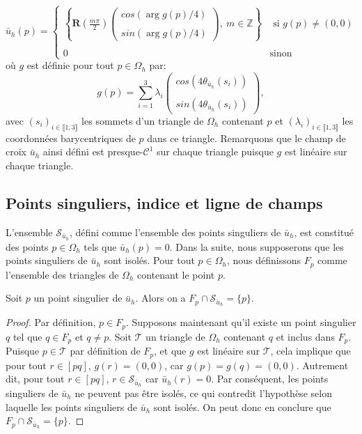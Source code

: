 \begin{equation}
    \bar{u}_h(p) =
\left\{ 
    \begin{array}{lc}
        \displaystyle\left\{\mathbf{R}\left(\frac{m\pi}{2}\right)
        \begin{pmatrix} 
          cos(\arg{g(p)}/4)\\\\
          sin(\arg{g(p)}/4)
        \end{pmatrix},
        ~ m\in \mathbb{Z}\right\} &\text{ si }g(p)\neq (0, 0)\\\\
        0& \text{sinon}
    \end{array} 
\right.
\label{eqn:def_u_h}
\end{equation}
où $g$ est définie pour tout $p\in\Omega_h$ par:
\begin{equation}
    g(p)=\sum_{i=1}^3\lambda_i
    \begin{pmatrix} 
      cos(4\theta_{\bar{u}_h}(s_i))\\\\
      sin(4\theta_{\bar{u}_h}(s_i))
    \end{pmatrix},
\end{equation}
avec $(s_i)_{i\in\llbracket 1, 3\rrbracket}$ les sommets d'un triangle de $\Omega_h$ contenant $p$ et $(\lambda_i)_{i\in\llbracket 1, 3\rrbracket}$ les coordonnées barycentriques de $p$ dans ce triangle. Remarquons que le champ de croix $\bar{u}_h$ ainsi défini est presque-$\mathcal{C}^1$ sur chaque triangle puisque $g$ est linéaire sur chaque triangle.

\subsection{Points singuliers, indice et ligne de champs}

L'ensemble $\mathcal{S}_{\bar{u}_h}$, défini comme l'ensemble des points singuliers de $\bar{u}_h$, est constitué des points $p \in \Omega_h$ tels que $\bar{u}_h(p) = 0$. \color{red} Dans la suite, nous supposerons que les points singuliers de $\bar{u}_h$ sont isolés. \color{black} Pour tout $p\in\Omega_h$, nous définissons $F_p$ comme l'ensemble des triangles de $\Omega_h$ contenant le point $p$.
\begin{lemma}
    Soit $p$ un point singulier de $\bar{u}_h$. Alors on a $F_p\cap\mathcal{S}_{\bar{u}_h}=\{p\}$.
\end{lemma}
\begin{proof}
    Par définition, $p\in F_p$. Supposons maintenant qu'il existe un point singulier $q$ tel que $q\in F_p$ et $q\neq p$. Soit $\mathcal{T}$ un triangle de $\Omega_h$ contenant $q$ et inclus dans $F_p$. Puisque $p\in\mathcal{T}$ par définition de $F_p$, et que $g$ est linéaire sur $\mathcal{T}$, cela implique que pour tout $r\in[pq]$, $g(r)=(0, 0)$, car $g(p)=g(q)=(0,0)$. Autrement dit, pour tout $r\in[pq]$, $r\in\mathcal{S}_{\bar{u}_h}$ car $\bar{u}_h(r)=0$. Par conséquent, les points singuliers de $\bar{u}_h$ ne peuvent pas être isolés, ce qui contredit l'hypothèse selon laquelle les points singuliers de $\bar{u}_h$ sont isolés. On peut donc en conclure que $F_p\cap\mathcal{S}_{\bar{u}_h}=\{p\}$.
\end{proof}


